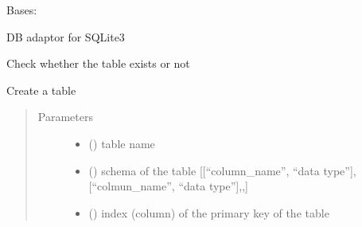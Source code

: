 \documentclass[letterpaper,10pt,english]{sphinxmanual}
\begin{document}
\begin{fulllineitems}
\label{\detokenize{bbc1.core.data_handler:bbc1.core.data_handler.SqliteAdaptor}}
Bases: {\hyperref[\detokenize{bbc1.core.data_handler:bbc1.core.data_handler.DbAdaptor}]{}}

DB adaptor for SQLite3

\begin{fulllineitems}
\label{\detokenize{bbc1.core.data_handler:bbc1.core.data_handler.SqliteAdaptor.check_table_existence}}
Check whether the table exists or not

\end{fulllineitems}


\begin{fulllineitems}
\label{\detokenize{bbc1.core.data_handler:bbc1.core.data_handler.SqliteAdaptor.create_table}}
Create a table
\begin{quote}\begin{description}
\item[{Parameters}] \leavevmode\begin{itemize}
\item {} 
 () \textendash{} table name

\item {} 
 () \textendash{} schema of the table {[}{[}“column\_name”, “data type”{]},{[}“colmun\_name”, “data type”{]},,{]}

\item {} 
 () \textendash{} index (column) of the primary key of the table


\end{itemize}
\end{description}
\end{quote}
\end{fulllineitems}
\end{fulllineitems}
\end{document}

